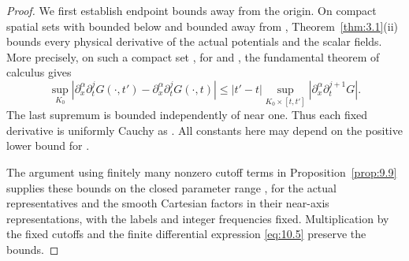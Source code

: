 \begin{proof}
We first establish endpoint bounds away from the origin. On compact spatial sets with
 bounded below and bounded away from ,
Theorem~\ref{thm:3.1}\textup{(ii)} bounds every physical derivative of the actual potentials and
the scalar fields. More precisely, on such a compact set , for
 and
, the fundamental theorem of calculus gives
\[
\sup_{K_0}|\partial_x^\alpha\partial_t^jG(\mathord\cdot,t')
 -\partial_x^\alpha\partial_t^jG(\mathord\cdot,t)|
\leq|t'-t|\sup_{K_0\times[t,t']}|\partial_x^\alpha\partial_t^{j+1}G|.
\]
The last supremum is bounded independently of  near one. Thus each fixed
derivative is uniformly Cauchy as . All constants here may depend
on the positive lower bound for .

The argument using finitely many nonzero cutoff terms in Proposition~\ref{prop:9.9} supplies these
bounds on the closed parameter range , for the actual
representatives and the smooth Cartesian factors in their near-axis representations, with the labels
and integer frequencies fixed. Multiplication by the fixed cutoffs and the finite differential
expression \eqref{eq:10.5} preserve the bounds.


\end{proof}
